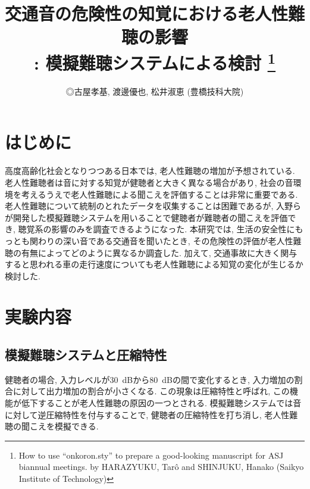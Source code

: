 \documentclass[10pt,twocolumn,uplatex,dvipdfmx]{jsarticle} %
\title{交通音の危険性の知覚における老人性難聴の影響\\ : 模擬難聴システムによる検討
\thanks{How to use ``onkoron.sty'' to prepare a good-looking
manuscript for ASJ biannual meetings. by HARAZYUKU, Tar\^o and
SHINJUKU, Hanako (Saikyo Institute of Technology)}
}
\author{◎古屋孝基, 渡邊優也, 松井淑恵 (豊橋技科大院)}
\begin{document}
\maketitle

\section{はじめに}
高度高齢化社会となりつつある日本では, 老人性難聴の増加が予想されている. 老人性難聴者は音に対する知覚が健聴者と大きく異なる場合があり, 社会の音環境を考えるうえで老人性難聴による聞こえを評価することは非常に重要である.
老人性難聴について統制のとれたデータを収集することは困難であるが, 入野らが開発した模擬難聴システムを用いることで健聴者が難聴者の聞こえを評価でき, 聴覚系の影響のみを調査できるようになった\cite{nagae2014hearing}.
本研究では, 生活の安全性にもっとも関わりの深い音である交通音を聞いたとき, その危険性の評価が老人性難聴の有無によってどのように異なるか調査した. 加えて, 交通事故に大きく関与すると思われる車の走行速度についても老人性難聴による知覚の変化が生じるか検討した.

\section{実験内容}

\subsection{模擬難聴システムと圧縮特性}

健聴者の場合, 入力レベルが30~dBから80~dBの間で変化するとき, 入力増加の割合に対して出力増加の割合が小さくなる. この現象は圧縮特性と呼ばれ, この機能が低下することが老人性難聴の原因の一つとされる. 模擬難聴システムでは音に対して逆圧縮特性を付与することで, 健聴者の圧縮特性を打ち消し, 老人性難聴の聞こえを模擬できる.
\end{document}
